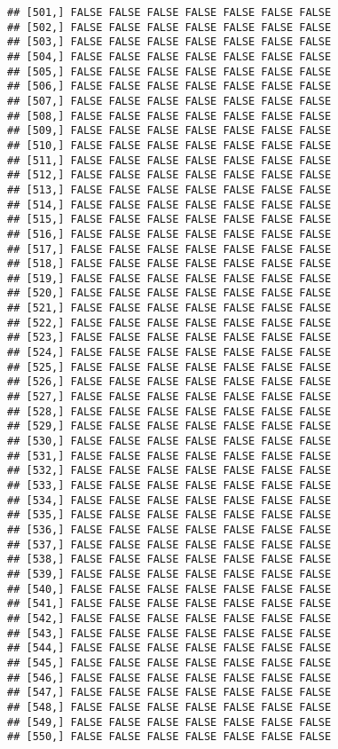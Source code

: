 \documentclass[
]{article}
\begin{document}
\begin{verbatim}
## [501,] FALSE FALSE FALSE FALSE FALSE FALSE FALSE
## [502,] FALSE FALSE FALSE FALSE FALSE FALSE FALSE
## [503,] FALSE FALSE FALSE FALSE FALSE FALSE FALSE
## [504,] FALSE FALSE FALSE FALSE FALSE FALSE FALSE
## [505,] FALSE FALSE FALSE FALSE FALSE FALSE FALSE
## [506,] FALSE FALSE FALSE FALSE FALSE FALSE FALSE
## [507,] FALSE FALSE FALSE FALSE FALSE FALSE FALSE
## [508,] FALSE FALSE FALSE FALSE FALSE FALSE FALSE
## [509,] FALSE FALSE FALSE FALSE FALSE FALSE FALSE
## [510,] FALSE FALSE FALSE FALSE FALSE FALSE FALSE
## [511,] FALSE FALSE FALSE FALSE FALSE FALSE FALSE
## [512,] FALSE FALSE FALSE FALSE FALSE FALSE FALSE
## [513,] FALSE FALSE FALSE FALSE FALSE FALSE FALSE
## [514,] FALSE FALSE FALSE FALSE FALSE FALSE FALSE
## [515,] FALSE FALSE FALSE FALSE FALSE FALSE FALSE
## [516,] FALSE FALSE FALSE FALSE FALSE FALSE FALSE
## [517,] FALSE FALSE FALSE FALSE FALSE FALSE FALSE
## [518,] FALSE FALSE FALSE FALSE FALSE FALSE FALSE
## [519,] FALSE FALSE FALSE FALSE FALSE FALSE FALSE
## [520,] FALSE FALSE FALSE FALSE FALSE FALSE FALSE
## [521,] FALSE FALSE FALSE FALSE FALSE FALSE FALSE
## [522,] FALSE FALSE FALSE FALSE FALSE FALSE FALSE
## [523,] FALSE FALSE FALSE FALSE FALSE FALSE FALSE
## [524,] FALSE FALSE FALSE FALSE FALSE FALSE FALSE
## [525,] FALSE FALSE FALSE FALSE FALSE FALSE FALSE
## [526,] FALSE FALSE FALSE FALSE FALSE FALSE FALSE
## [527,] FALSE FALSE FALSE FALSE FALSE FALSE FALSE
## [528,] FALSE FALSE FALSE FALSE FALSE FALSE FALSE
## [529,] FALSE FALSE FALSE FALSE FALSE FALSE FALSE
## [530,] FALSE FALSE FALSE FALSE FALSE FALSE FALSE
## [531,] FALSE FALSE FALSE FALSE FALSE FALSE FALSE
## [532,] FALSE FALSE FALSE FALSE FALSE FALSE FALSE
## [533,] FALSE FALSE FALSE FALSE FALSE FALSE FALSE
## [534,] FALSE FALSE FALSE FALSE FALSE FALSE FALSE
## [535,] FALSE FALSE FALSE FALSE FALSE FALSE FALSE
## [536,] FALSE FALSE FALSE FALSE FALSE FALSE FALSE
## [537,] FALSE FALSE FALSE FALSE FALSE FALSE FALSE
## [538,] FALSE FALSE FALSE FALSE FALSE FALSE FALSE
## [539,] FALSE FALSE FALSE FALSE FALSE FALSE FALSE
## [540,] FALSE FALSE FALSE FALSE FALSE FALSE FALSE
## [541,] FALSE FALSE FALSE FALSE FALSE FALSE FALSE
## [542,] FALSE FALSE FALSE FALSE FALSE FALSE FALSE
## [543,] FALSE FALSE FALSE FALSE FALSE FALSE FALSE
## [544,] FALSE FALSE FALSE FALSE FALSE FALSE FALSE
## [545,] FALSE FALSE FALSE FALSE FALSE FALSE FALSE
## [546,] FALSE FALSE FALSE FALSE FALSE FALSE FALSE
## [547,] FALSE FALSE FALSE FALSE FALSE FALSE FALSE
## [548,] FALSE FALSE FALSE FALSE FALSE FALSE FALSE
## [549,] FALSE FALSE FALSE FALSE FALSE FALSE FALSE
## [550,] FALSE FALSE FALSE FALSE FALSE FALSE FALSE

\end{verbatim}
\end{document}
